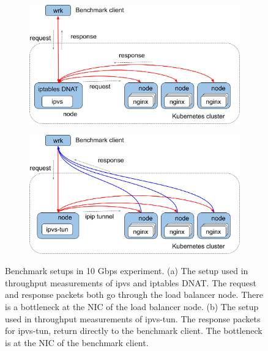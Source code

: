 \begin{figure}[h]
  \begin{subfigure}[t]{\columnwidth}
    \centering
    \includegraphics[width=0.8\columnwidth]{Figs/benchmark-schem-10g-nat}
    \par\bigskip
    \centering
    \begin{minipage}{0.9\columnwidth}
      \caption{}
      \label{fig:benchmark-schem-10g-nat}
    \end{minipage}
  \end{subfigure}

  \begin{subfigure}[t]{\columnwidth}
    \centering
    \includegraphics[width=0.8\columnwidth]{Figs/benchmark-schem-10g-dsr}
    \par\bigskip
    \centering
    \begin{minipage}{0.9\columnwidth}
      \caption{}
      \label{fig:benchmark-schem-10g-dsr}
    \end{minipage}
  \end{subfigure}

  \par\bigskip
  \centering
  \begin{minipage}{0.9\columnwidth}
    \caption[Benchmark setups in 10 Gbps experiment]{
      Benchmark setups in 10 Gbps experiment.
      (a) The setup used in throughput measurements of ipvs and iptables DNAT.
      The request and response packets both go through the load balancer node.
      There is a bottleneck at the NIC of the load balancer node.
      (b) The setup used in throughput measurements of ipvs-tun.
      The response packets for ipvs-tun, return directly to the benchmark client.
      The bottleneck is at the NIC of the benchmark client.
    }
    \label{fig:benchmark-schem-10g}
  \end{minipage}
\end{figure}

